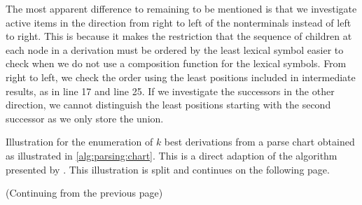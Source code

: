 \documentclass[../../document.tex]{subfiles}
\begin{document}
    The most apparent difference to  remaining to be mentioned is that we investigate active items in the direction from right to left of the  nonterminals instead of left to right.
    This is because it makes the restriction that the sequence of children at each node in a  derivation must be ordered by the least lexical symbol easier to check when we do not use a composition function for the lexical symbols.
    From right to left, we check the order using the least positions included in intermediate results, as in line 17 and line 25.
    If we investigate the successors in the other direction, we cannot distinguish the least positions starting with the second successor as we only store the union.
    
    \begin{algorithm}
        \caption{\label{alg:parsing:deriv}
            Illustration for the enumeration of $k$ best derivations from a parse chart obtained as illustrated in \cref{alg:parsing:chart}.
            This is a direct adaption of the algorithm presented by \citet{HuaChia05}.
            This illustration is split and continues on the following page.
        }
        
    \end{algorithm}
    
    \begin{algorithm}\ContinuedFloat
        \caption{
            (Continuing from the previous page)
        }
        
    \end{algorithm}
    
\end{document}
